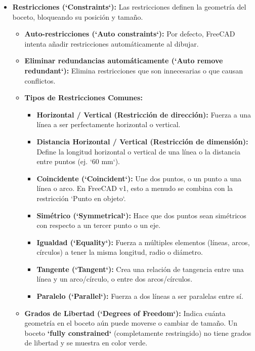 \documentclass[12pt]{article}
\begin{document}
\begin{itemize}[label=\textbullet]

    \item \textbf{Restricciones (`Constraints`):} Las restricciones definen la geometría del boceto, bloqueando su posición y tamaño.
    \begin{itemize}[label=\textendash]
        \item \textbf{Auto-restricciones (`Auto constraints`):} Por defecto, FreeCAD intenta añadir restricciones automáticamente al dibujar.
        \item \textbf{Eliminar redundancias automáticamente (`Auto remove redundant`):} Elimina restricciones que son innecesarias o que causan conflictos.
        \item \textbf{Tipos de Restricciones Comunes:}
        \begin{itemize}[label=\textendash]
            \item \textbf{Horizontal / Vertical (Restricción de dirección):} Fuerza a una línea a ser perfectamente horizontal o vertical.
            \item \textbf{Distancia Horizontal / Vertical (Restricción de dimensión):} Define la longitud horizontal o vertical de una línea o la distancia entre puntos (ej. `60 mm`).
            \item \textbf{Coincidente (`Coincident`):} Une dos puntos, o un punto a una línea o arco. En FreeCAD v1, esto a menudo se combina con la restricción `Punto en objeto`.
            \item \textbf{Simétrico (`Symmetrical`):} Hace que dos puntos sean simétricos con respecto a un tercer punto o un eje.
            \item \textbf{Igualdad (`Equality`):} Fuerza a múltiples elementos (líneas, arcos, círculos) a tener la misma longitud, radio o diámetro.
            \item \textbf{Tangente (`Tangent`):} Crea una relación de tangencia entre una línea y un arco/círculo, o entre dos arcos/círculos.
            \item \textbf{Paralelo (`Parallel`):} Fuerza a dos líneas a ser paralelas entre sí.
        \end{itemize}
        \item \textbf{Grados de Libertad (`Degrees of Freedom`):} Indica cuánta geometría en el boceto aún puede moverse o cambiar de tamaño. Un boceto \textbf{`fully constrained`} (completamente restringido) no tiene grados de libertad y se muestra en color verde.
    \end{itemize}


\end{itemize}
\end{document}
